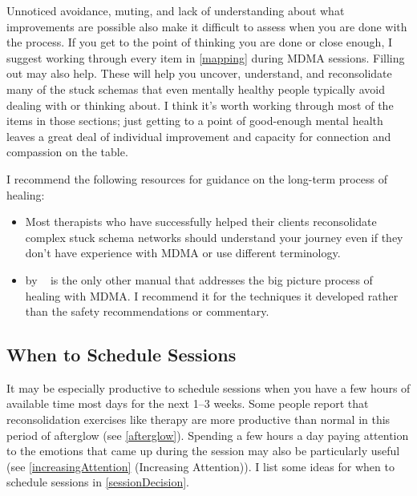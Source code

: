 \documentclass[11pt,oneside]{book}
\let\cite\parencite
\newcommand{\prosecite}[1]{\citetitle{#1} by \citefullauthor{#1}~\cite{#1}}
\begin{document}
Unnoticed avoidance, muting, and lack of understanding about what improvements are possible also make it difficult to assess when you are done with the process. If you get to the point of thinking you are done or close enough, I suggest working through every item in \cref{mapping} during MDMA sessions. Filling out \textcite{maladaptiveSchemaScale} may also help. These will help you uncover, understand, and reconsolidate many of the stuck schemas that even mentally healthy people typically avoid dealing with or thinking about. I think it's worth working through most of the items in those sections; just getting to a point of good-enough mental health leaves a great deal of individual improvement and capacity for connection and compassion on the table.

I recommend the following resources for guidance on the long-term process of healing:
\begin{itemize}
    \item Most therapists who have successfully helped their clients reconsolidate complex stuck schema networks should understand your journey even if they don't have experience with MDMA or use different terminology.
    \item \prosecite{kaspianSolo} is the only other manual that addresses the big picture process of healing with MDMA. I recommend it for the techniques it developed rather than the safety recommendations or commentary.
\end{itemize}

\subsection*{When to Schedule Sessions}
\FloatBarrier
It may be especially productive to schedule sessions when you have a few hours of available time most days for the next 1--3 weeks. Some people report that reconsolidation exercises like therapy are more productive than normal in this period of afterglow (see \cref{afterglow}). Spending a few hours a day paying attention to the emotions that came up during the session may also be particularly useful (see \cref{increasingAttention} (Increasing Attention)). I list some ideas for when to schedule sessions in \cref{sessionDecision}.
\end{document}
